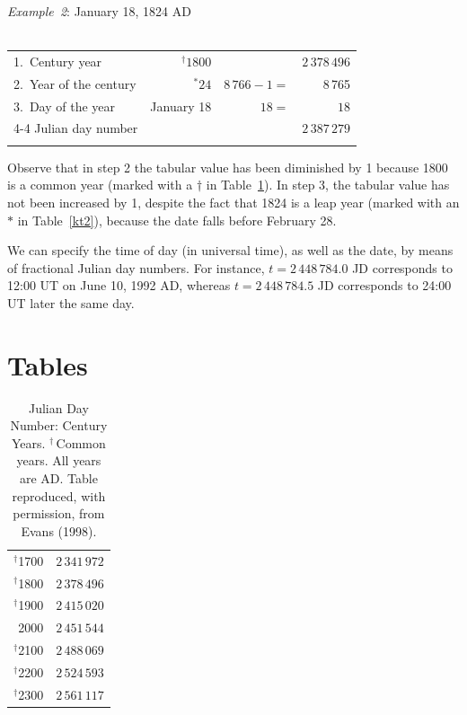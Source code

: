 \begin{center}
 {\em Example~2}: January 18, 1824 AD\\
 ~\\
\begin{tabular}{lrrr}
1.~Century year & $^\dag1800$ &&$2\,378\,496$\\
2.~Year of the century & $^\ast24$ & $8\,766 - 1=$ & 8\,765\\
3.~Day of the year & January 18 & $18 =$ & $18$\\\cline{4-4}
Julian day number&&&$2\,387\,279$\\
&&&\\
\end{tabular}
\end{center}
Observe that in step 2 the tabular value has been diminished by 1 because 1800
is a common year (marked with a $\dag$ in Table~\ref{kt1}). In step 3, the
tabular value has not been increased by 1, despite the fact that 1824 is a leap year (marked with an $\ast$ in Table~\ref{kt2}),  because the
date falls before February 28.

We can specify the time of day (in universal time), as well as the date, 
by means of fractional Julian day numbers. For instance,
$t=2\,448\,784.0$ JD corresponds to 12:00 UT  on  June 10, 1992 AD, whereas
$t=2\,448\,784.5$ JD corresponds to 24:00 UT later the same day.

\section{Tables}

\begin{table}[!h]\centering
\begin{tabular}{rr}
$^\dag$1700 &  $2\,341\,972$\\
 $^\dag$1800 &  $2\,378\,496$\\
 $^\dag$1900 & $2\,415\,020$\\
 2000 & $2\,451\,544$\\
 $^\dag$2100 & $2\,488\,069$\\
 $^\dag$2200 & $2\,524\,593$\\
  $^\dag$2300 & $2\,561\,117$
\end{tabular}
\caption {Julian Day Number: Century Years. $^\dag$\,Common years. All years are AD. Table reproduced, with permission, from Evans (1998).}\label{kt1}
\end{table}

